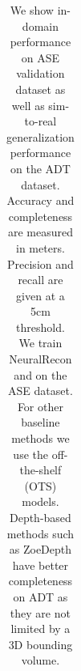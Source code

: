 \begin{table}[]
{\begin{tabular}{c|c|c||c|c|c|c||c|c|c|c}
    \end{tabular}
    }
    \caption{We show in-domain performance on ASE validation dataset as well as sim-to-real generalization performance on the ADT dataset. Accuracy and completeness are measured in meters. Precision and recall are given at a 5cm threshold. We train NeuralRecon and \EFMmodel{} on the ASE dataset. For other baseline methods we use the off-the-shelf (OTS) models. Depth-based methods such as ZoeDepth have better completeness on ADT as they are not limited by a 3D bounding volume.}
    \label{tab:surf_perf}
    \vspace{-5mm}
\end{table}

